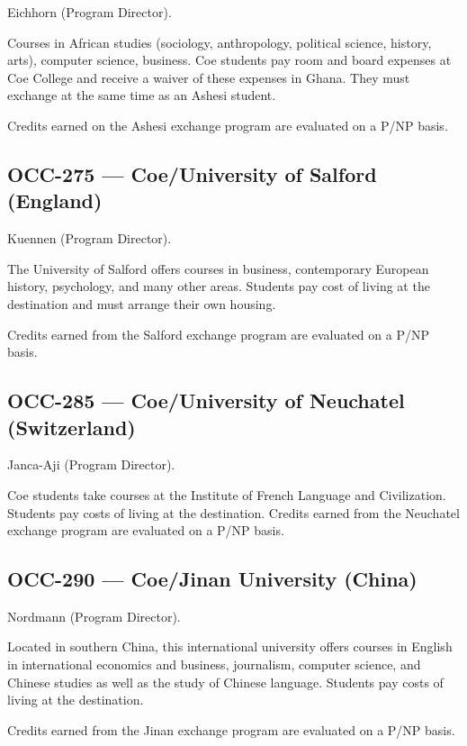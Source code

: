 \documentclass[
  letterpaper,
]{scrbook}
\begin{document}
Eichhorn (Program Director).

Courses in African studies (sociology, anthropology, political science,
history, arts), computer science, business. Coe students pay room and
board expenses at Coe College and receive a waiver of these expenses in
Ghana. They must exchange at the same time as an Ashesi student.

Credits earned on the Ashesi exchange program are evaluated on a P/NP
basis.

\subsection{OCC-275 --- Coe/University of Salford
(England)}\label{occ-275-coeuniversity-of-salford-england}

Kuennen (Program Director).

The University of Salford offers courses in business, contemporary
European history, psychology, and many other areas. Students pay cost of
living at the destination and must arrange their own housing.

Credits earned from the Salford exchange program are evaluated on a P/NP
basis.

\subsection{OCC-285 --- Coe/University of Neuchatel
(Switzerland)}\label{occ-285-coeuniversity-of-neuchatel-switzerland}

Janca-Aji (Program Director).

Coe students take courses at the Institute of French Language and
Civilization. Students pay costs of living at the destination. Credits
earned from the Neuchatel exchange program are evaluated on a P/NP
basis.

\subsection{OCC-290 --- Coe/Jinan University
(China)}\label{occ-290-coejinan-university-china}

Nordmann (Program Director).

Located in southern China, this international university offers courses
in English in international economics and business, journalism, computer
science, and Chinese studies as well as the study of Chinese language.
Students pay costs of living at the destination.

Credits earned from the Jinan exchange program are evaluated on a P/NP
basis.
\end{document}
